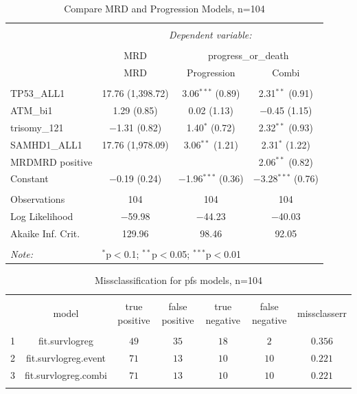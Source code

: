 \documentclass[a4paper,11pt]{article}
\begin{document}
\begin{table}[!htbp] \centering 
  \caption{Compare MRD and Progression Models, n=104} 
  \label{} 
\small 
\begin{tabular}{@{\extracolsep{5pt}}lccc} 
\\[-1.8ex]\hline 
\hline \\[-1.8ex] 
 & \multicolumn{3}{c}{\textit{Dependent variable:}} \\ 
\cline{2-4} 
\\[-1.8ex] & MRD & \multicolumn{2}{c}{progress\_or\_death} \\ 
 & MRD & Progression & Combi \\ 
\hline \\[-1.8ex] 
 TP53\_ALL1 & 17.76 (1,398.72) & 3.06$^{***}$ (0.89) & 2.31$^{**}$ (0.91) \\ 
  ATM\_bi1 & 1.29 (0.85) & 0.02 (1.13) & $-$0.45 (1.15) \\ 
  trisomy\_121 & $-$1.31 (0.82) & 1.40$^{*}$ (0.72) & 2.32$^{**}$ (0.93) \\ 
  SAMHD1\_ALL1 & 17.76 (1,978.09) & 3.06$^{**}$ (1.21) & 2.31$^{*}$ (1.22) \\ 
  MRDMRD positive &  &  & 2.06$^{**}$ (0.82) \\ 
  Constant & $-$0.19 (0.24) & $-$1.96$^{***}$ (0.36) & $-$3.28$^{***}$ (0.76) \\ 
 \hline \\[-1.8ex] 
Observations & 104 & 104 & 104 \\ 
Log Likelihood & $-$59.98 & $-$44.23 & $-$40.03 \\ 
Akaike Inf. Crit. & 129.96 & 98.46 & 92.05 \\ 
\hline 
\hline \\[-1.8ex] 
\textit{Note:}  & \multicolumn{3}{l}{$^{*}$p$<$0.1; $^{**}$p$<$0.05; $^{***}$p$<$0.01} \\ 
\end{tabular} 
\end{table} 

\begin{table}[!htbp] \centering 
  \caption{Missclassification for pfs models, n=104} 
  \label{} 
\tiny 
\begin{tabular}{@{\extracolsep{1p}} ccccccc} 
\\[-1.8ex]\hline 
\hline \\[-1.8ex] 
 & model & true positive & false positive & true negative & false negative & missclasserr \\ 
\hline \\[-1.8ex] 
1 & fit.survlogreg & $49$ & $35$ & $18$ & $2$ & $0.356$ \\ 
2 & fit.survlogreg.event & $71$ & $13$ & $10$ & $10$ & $0.221$ \\ 
3 & fit.survlogreg.combi & $71$ & $13$ & $10$ & $10$ & $0.221$ \\ 
\hline \\[-1.8ex] 
\end{tabular} 
\end{table} \pagebreak
\end{document}
